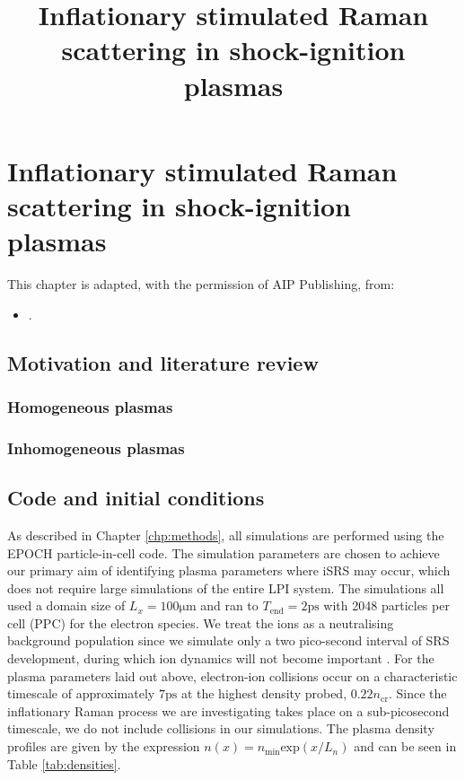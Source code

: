 
\chapter{Inflationary stimulated Raman scattering in shock-ignition plasmas}
\label{chp:iSRS}

\nobibliography*

\title{Inflationary stimulated Raman scattering in shock-ignition plasmas}

This chapter is adapted, with the permission of AIP Publishing, from:
\begin{itemize}
  \item {}.
\end{itemize}

\section{Motivation and literature review}
\subsection{Homogeneous plasmas}
\subsection{Inhomogeneous plasmas}


\section{Code and initial conditions}\label{sec:code&IC}
As described in Chapter \ref{chp:methods}, all simulations are performed using the EPOCH \cite{Arber2015} particle-in-cell code. The simulation parameters are chosen to achieve our primary aim of identifying plasma parameters where iSRS may occur, which does not require large simulations of the entire LPI system. The simulations all used a domain size of $L_x = 100\si{\micro\metre} $ and ran to $T_\mathrm{end} = 2\si{\pico\second}$
with 2048
particles per cell (PPC) for the electron species.
We treat the ions as a neutralising background population since we simulate only a two pico-second interval of SRS
development, during which ion dynamics will not become important \cite{Rousseaux2006}.
For the plasma parameters laid out above, electron-ion collisions occur on a characteristic timescale of approximately
$7 \si{\pico\second}$ at the highest density probed, $0.22n_\mathrm{cr}$. Since the inflationary Raman process we
are investigating takes place
on a sub-picosecond timescale, we do not include collisions in our simulations.
The plasma density profiles are given by the expression $n(x) = n_\mathrm{min}\mathrm{exp}(x/L_n)$ and can be seen in Table
\ref{tab:densities}.

